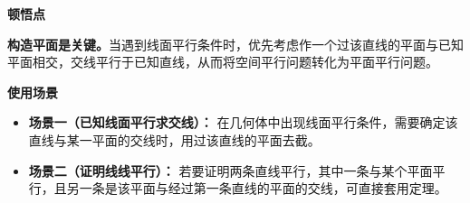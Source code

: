 \begin{explanationbox}
	\medskip
	\textbf{\textcolor{CExplanation}{顿悟点}}

	\textbf{构造平面是关键。}当遇到线面平行条件时，优先考虑作一个过该直线的平面与已知平面相交，交线平行于已知直线，从而将空间平行问题转化为平面平行问题。

	\medskip
	\textbf{\textcolor{CExplanation}{使用场景}}
	\begin{itemize}[leftmargin=*, itemsep=0.5em, topsep=0.4em]
		\item \textbf{场景一（已知线面平行求交线）：} 在几何体中出现线面平行条件，需要确定该直线与某一平面的交线时，用过该直线的平面去截。
		\item \textbf{场景二（证明线线平行）：} 若要证明两条直线平行，其中一条与某个平面平行，且另一条是该平面与经过第一条直线的平面的交线，可直接套用定理。
	\end{itemize}
\end{explanationbox}
